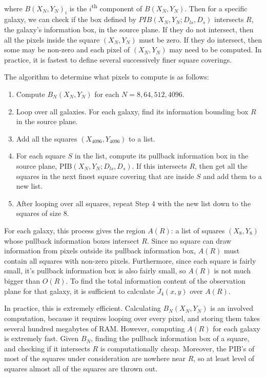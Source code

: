 \documentclass[10pt,twoside]{article}
\theoremstyle{definition}
\theoremstyle{exercise}
\begin{document}
where $B(X_N,Y_N)_i$ is the $i$\textsuperscript{th} component of $B(X_N,Y_N)$. Then for a specific galaxy, we can check if the box defined by $PIB(X_N,Y_N; D_{ls}, D_s)$ intersects $R$, the galaxy's information box, in the source plane. If they do not intersect, then all the pixels inside the square $(X_N,Y_N)$ must be zero. If they do intersect, then some may be non-zero and each pixel of $(X_N,Y_N)$ may need to be computed. In practice, it is fastest to define several successively finer square coverings.

The algorithm to determine what pixels to compute is as follows:
\begin{enumerate}
  \item Compute $B_N(X_N,Y_N)$ for each $N = 8, 64, 512, 4096$.
  \item Loop over all galaxies. For each galaxy, find its information bounding box $R$ in the source plane.
  \item Add all the squares $(X_{4096}, Y_{4096})$ to a list.
  \item For each square $S$ in the list, compute its pullback information box in the source plane, $\text{PIB}(X_N,Y_N; D_{ls}, D_{s})$. If this intersects $R$, then get all the squares in the next finest square covering that are inside $S$ and add them to a new list.
  \item After looping over all squares, repeat Step 4 with the new list down to the squares of size $8$.
\end{enumerate}
For each galaxy, this process gives the region $A(R)$: a list of squares $(X_8, Y_8)$ whose pullback information boxes intersect $R$. Since no square can draw information from pixels outside its pullback information box, $A(R)$ must contain all squares with non-zero pixels. Furthermore, since each square is fairly small, it's pullback information box is also fairly small, so $A(R)$ is not much bigger than $O(R)$. To find the total information content of the observation plane for that galaxy, it is sufficient to calculate $\tilde{J}_4(x,y)$ over $A(R)$.

In practice, this is extremely efficient. Calculating $B_N(X_N,Y_N)$ is an involved computation, because it requires looping over every pixel, and storing them takes several hundred megabytes of RAM. However, computing $A(R)$ for each galaxy is extremely fast. Given $B_N$, finding the pullback information box of a square, and checking if it intersects $R$ is computationally cheap. Moreover, the PIB's of most of the squares under consideration are nowhere near $R$, so at least level of squares almost all of the squares are thrown out.
\end{document}
